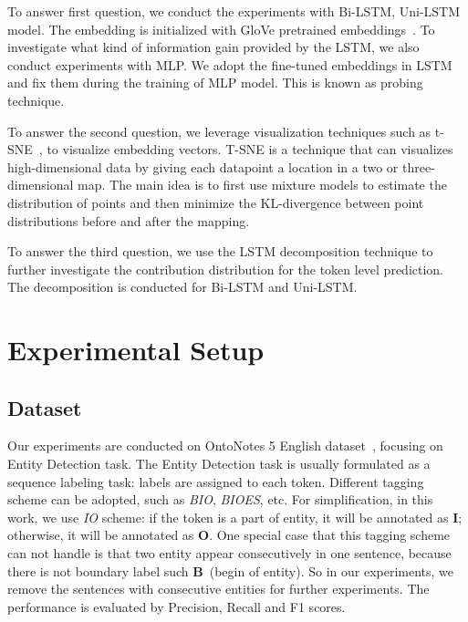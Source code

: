 \documentclass{article}
\begin{document}
To answer first question, we conduct the experiments with Bi-LSTM, Uni-LSTM model. The embedding is initialized with GloVe pretrained embeddings~\cite{pennington2014glove}. To investigate what kind of information gain provided by the LSTM, we also conduct experiments with MLP. We adopt the fine-tuned embeddings in LSTM and fix them during the training of MLP model. This is known as probing technique. 

To answer the second question, we leverage visualization techniques such as t-SNE~\cite{maaten2008visualizing}, to visualize embedding vectors. T-SNE is a technique that can visualizes high-dimensional data by giving each datapoint a location in a two or three-dimensional map. The main idea is to first use mixture models to estimate the distribution of points and then minimize the KL-divergence between point distributions before and after the mapping.

To answer the third question, we use the LSTM decomposition technique to further investigate the contribution distribution for the token level prediction. The decomposition is conducted for Bi-LSTM and Uni-LSTM. 

\section{Experimental Setup}


\subsection{Dataset} 

Our experiments are conducted on OntoNotes 5 English dataset~\cite{weischedel2012ontonotes}, focusing on Entity Detection task. The Entity Detection task is usually formulated as a sequence labeling task: labels are assigned to each token. Different tagging scheme can be adopted, such as \textit{BIO}, \textit{BIOES}, etc. For simplification, in this work, we use \textit{IO} scheme: if the token is a part of entity, it will be annotated as \textbf{I}; otherwise, it will be annotated as \textbf{O}. One special case that this tagging scheme can not handle is that two entity appear consecutively in one sentence, because there is not boundary label such \textbf{B}~(begin of entity). So in our experiments, we remove the sentences with consecutive entities for further experiments. The performance is evaluated by Precision, Recall and F1 scores.
\end{document}
